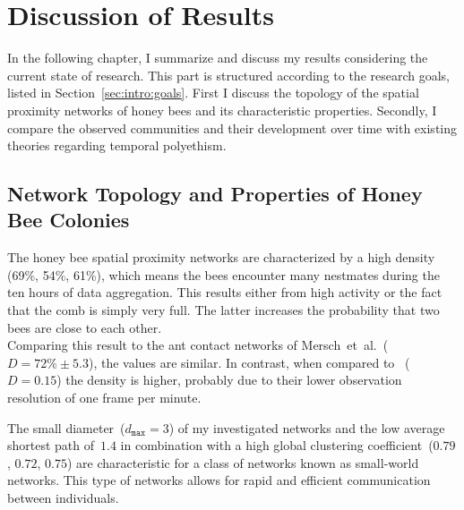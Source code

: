 \section{Discussion of Results}

In the following chapter, I summarize and discuss my results considering the current state of research.
This part is structured according to the research goals, listed in Section~\ref{sec:intro:goals}.
First I discuss the topology of the spatial proximity networks of honey bees and its characteristic properties.
Secondly, I compare the observed communities and their development over time with existing theories regarding temporal polyethism.


\subsection{Network Topology and Properties of Honey Bee Colonies}
The honey bee spatial proximity networks are characterized by a high density (69\%, 54\%, 61\%), which means the bees encounter many nestmates during the ten hours of data aggregation.
This results either from high activity or the fact that the comb is simply very full.
The latter increases the probability that two bees are close to each other.\\
Comparing this result to the ant contact networks of Mersch~et~al.\cite{mersch2013tracking}~($D=72\%\pm5.3$), the values are similar.
In contrast, when compared to \textcite{baracchi2014socio}~($D=0.15$) the density is higher, probably due to their lower observation resolution of one frame per minute.


The small diameter~($d_{\texttt{max}}=3$) of my investigated networks and the low average shortest path of~$1.4$ in combination with a high global clustering coefficient~($0.79$, $0.72$, $0.75$) are characteristic for a class of networks known as small-world networks.
This type of networks allows for rapid and efficient communication between individuals.


